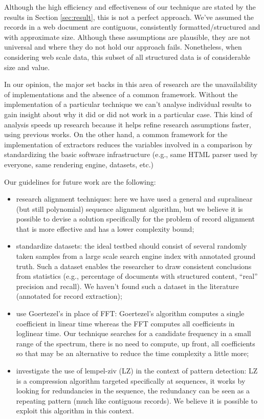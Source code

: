 \documentclass{vldb}
\begin{document}
Although the high efficiency and effectiveness of our technique are stated by
the results in Section \ref{sec:result}, this is not a perfect approach. We've
assumed the records in a web document are contiguous, consistently
formatted/structured and with approximate size. Although these assumptions are
plausible, they are not universal and where they do not hold our approach fails.
Nonetheless, when considering web scale data, this subset of all structured data
is of considerable size and value.

In our opinion, the major set backs in this area of research are the
unavailability of implementations and the absence of a common framework.
Without the implementation of a particular technique we can't analyse individual
results to gain insight about why it did or did not work in a particular case.
This kind of analysis speeds up research because it helps refine research
assumptions faster, using previous works. On the other hand, a common framework
for the implementation of extractors reduces the variables involved in a
comparison by standardizing the basic software infrastructure (e.g., same HTML
parser used by everyone, same rendering engine, datasets, etc.)
 
Our guidelines for future work are the following:
\begin{itemize}
  \item research alignment techniques: here we have used a general and
  supralinear (but still polynomial) sequence alignment algorithm, but we
  believe it is possible to devise a solution specifically for the problem of
  record alignment that is more effective and has a lower complexity bound;
  \item standardize datasets: the ideal testbed should consist of several
  randomly taken samples from a large scale search engine index with annotated
  ground truth.
  Such a dataset enables the researcher to draw consistent conclusions from statistics (e.g.,
  percentage of documents with structured content, ``real'' precision and
  recall). We haven't found such a dataset in the literature (annotated for
  record extraction);
  \item use Goertezel's \cite{goertzel1958algorithm} in place of FFT:
  Goertezel's algorithm computes a single coefficient in linear time whereas the
  FFT computes all coefficients in loglinear time. Our technique searches for a
  candidate frequency in a small range of the spectrum, there is no need to
  compute, up front, all coefficients so that may be an alternative to reduce
  the time complexity a little more;
  \item investigate the use of lempel-ziv\cite{ziv1977universal} (LZ) in the context of
  pattern detection: LZ is a compression algorithm targeted specifically at sequences,
  it works by looking for redundancies in the sequence, the redundancy can be
  seen as a repeating pattern (much like contiguous records). We believe it is
  possible to exploit this algorithm in this context.
\end{itemize}
 
\balance 



\end{document}

